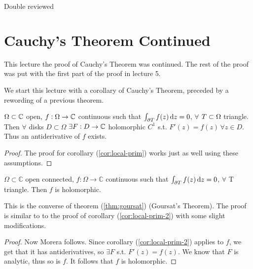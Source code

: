 \setcounter{section}{0}
\setcounter{theorem}{0}


Double reviewed

\section{Cauchy's Theorem Continued}

This lecture the proof of Cauchy's Theorem was continued. The rest of the proof was put with the first part of the proof in lecture 5.

We start this lecture with a corollary of Cauchy's Theorem, preceded by a rewording of a previous theorem.

\begin{corollary}\label{cor:local-prim-2}
$ \Omega \subset \mathbb{C} $ open, $f:\Omega \rightarrow \mathbb{C}$ continuous such that $\int_{\partial T} f(z) \dif z = 0$, $ \forall$ $T \subset \Omega$ triangle. Then $\forall$ disks $D\subset \Omega$ $\exists F:D\rightarrow \mathbb{C}$ holomorphic $C^1$ s.t. $F'(z)=f(z) \, \forall z\in D$. Thus an antiderivative of $f$ exists.
\end{corollary}

\begin{proof}
The proof for corollary (\ref{cor:local-prim}) works just as well using these assumptions.
\end{proof}


\begin{corollary}\label{cor:morera}
$\Omega \subset \mathbb{C}$ open connected, $f:\Omega \rightarrow \mathbb{C}$ continuous such that $\int_{\partial T} f(z) \dif z = 0$, $ \forall$ T triangle. Then $f$ is holomorphic.
\end{corollary}

\begin{note}
This is the converse of theorem (\ref{thm:goursat}) (Goursat's Theorem). The proof is similar to to the proof of corollary (\ref{cor:local-prim-2}) with some slight modifications.
\end{note}






\begin{proof} Now Morera follows. Since corollary (\ref{cor:local-prim-2}) applies to $f$, we get that it has antiderivatives, so $\exists F$ s.t. $F'(z)=f(z)$. We know that $F$ is analytic, thus so is $f$. It follows that $f$ is holomorphic.

\end{proof}





